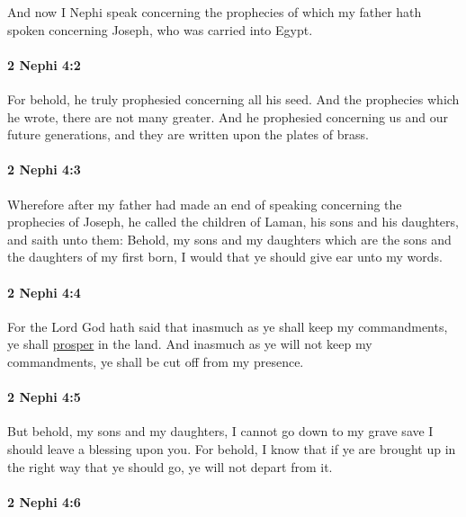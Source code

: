 			And now I Nephi speak concerning the prophecies
			of which my father hath spoken concerning Joseph, who was carried into Egypt.

		\paragraph{2 Nephi 4:2} %
			\label{2NEPHI-4-2}

			For behold, he truly prophesied concerning all his seed.
			And the prophecies which he wrote,
			there are not many greater.
			And he prophesied concerning us and our future generations,
			and they are written upon the plates of brass.

		\paragraph{2 Nephi 4:3} %
			\label{2NEPHI-4-3}

			Wherefore after my father had made an end of speaking
			concerning the prophecies of Joseph,
			he called the children of Laman, his sons and his daughters,
			and saith unto them:
			Behold, my sons and my daughters
			which are the sons and the daughters of my first born,
			I would that ye should give ear unto my words.

		\paragraph{2 Nephi 4:4} %
			\label{2NEPHI-4-4}

			For the Lord God hath said that
			inasmuch as ye shall keep my commandments,
			ye shall \hyperref[PROSPER-1828]{prosper} in the land.
			And inasmuch as ye will not keep my commandments,
			ye shall be cut off from my presence.

		\paragraph{2 Nephi 4:5} %
			\label{2NEPHI-4-5}

			But behold, my sons and my daughters,
			I cannot go down to my grave save I should leave a blessing upon you.
			For behold, I know that if ye are brought up in the right way that ye should go,
			ye will not depart from it.

		\paragraph{2 Nephi 4:6} %
			\label{2NEPHI-4-6}

